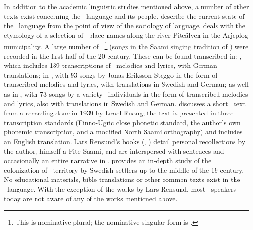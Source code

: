 In addition to the academic linguistic studies mentioned above, a number of other texts exist concerning the \PS\ language and its people. \citet{ValijarviWilbur2011} describe the current state of the \PS\ language from the  point of view of the sociology of language. \citet{sjaggo2010a} deals with the etymology of a selection of \PS\ place names along the river Piteälven in the Arjeplog municipality. 
A large number of \PS\ \footnote{This is nominative plural; the nominative singular form is .} 
(songs in the Saami singing tradition of ) were recorded in the first half of the 20 century. These can be found transcribed in: 
\citet{tiren1942a}, which includes 139 transcriptions of \PS\ melodies and lyrics, with German translations; 
in \citet{grundstroem1958a}, with 93 songs by Jonas Eriksson Steggo in the form of transcribed melodies and lyrics, with translations in Swedish and German; 
as well as in \citet{grundstroem1963a}, with 73 songs by a variety \PS\ individuals in the form of transcribed melodies and lyrics, also with translations in Swedish and German.
\citet{wickman1964} discusses a short \PS\ text from a recording done in 1939 by Israel Ruong; the text is presented in three transcription standards (Finno-Ugric close phonetic standard, the author’s own phonemic transcription, and a modified North Saami orthography) and includes an English translation. 
Lars Rensund’s books (\citeyear{Rensund1982}, \citeyear{Rensund1986}) detail personal recollections by the author, himself a Pite Saami, and are interspersed with sentences and occasionally an entire narrative in \PS. \citet{bylund1956} provides an in-depth study of the colonization of \PS\ territory by Swedish settlers up to the middle of the 19 century. 
No educational materials, bible translations or other common texts exist in the \PS\ language. With the exception of the works by Lars Rensund, most \PS\ speakers today are not aware of any of the works mentioned above. 



